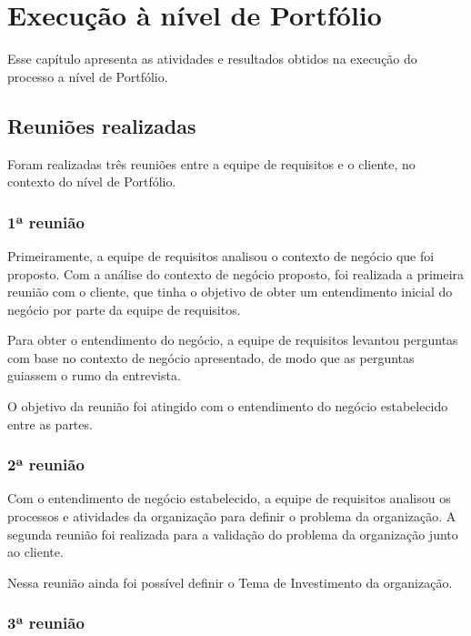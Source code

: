 \chapter{Execução à nível de Portfólio}
  
  Esse capítulo apresenta as atividades e resultados obtidos na execução do processo a nível de Portfólio.
  
  \section{Reuniões realizadas}
    
    Foram realizadas três reuniões entre a equipe de requisitos e o cliente, no contexto do nível de Portfólio. 
    
    \subsection{1ª reunião}
      
      Primeiramente, a equipe de requisitos analisou o contexto de negócio que foi proposto.
      Com a análise do contexto de negócio proposto, foi realizada a primeira reunião com o cliente, que tinha o objetivo de 
      obter um entendimento inicial do negócio por parte da equipe de requisitos.
      
      Para obter o entendimento do negócio, a equipe de requisitos levantou perguntas com base no contexto de negócio apresentado, 
      de modo que as perguntas guiassem o rumo da entrevista.
      
      O objetivo da reunião foi atingido com o entendimento do negócio estabelecido entre as partes.
      
    \subsection{2ª reunião}
    
      Com o entendimento de negócio estabelecido, a equipe de requisitos analisou os processos e atividades da 
      organização para definir o problema da organização. A segunda reunião foi realizada para a validação do problema 
      da organização junto ao cliente.
      
      Nessa reunião ainda foi possível definir o Tema de Investimento da organização.
    
    \subsection{3ª reunião}
    

